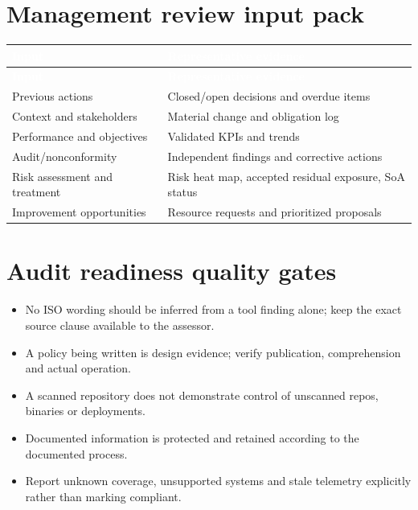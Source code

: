 \documentclass[11pt,letterpaper]{article}
\begin{document}
\section{Management review input pack}
\small{}\begin{longtable}{>{\raggedright\arraybackslash}p{}>{\raggedright\arraybackslash}p{}}
\rowcolor{navy} \textcolor{white}{\textbf{Input}} & \textcolor{white}{\textbf{Representative evidence}}\\
\endfirsthead
\rowcolor{navy} \textcolor{white}{\textbf{Input}} & \textcolor{white}{\textbf{Representative evidence}}\\
\endhead
Previous actions & Closed/open decisions and overdue items\\
Context and stakeholders & Material change and obligation log\\
Performance and objectives & Validated KPIs and trends\\
Audit/nonconformity & Independent findings and corrective actions\\
Risk assessment and treatment & Risk heat map, accepted residual exposure, SoA status\\
Improvement opportunities & Resource requests and prioritized proposals\\
\end{longtable}\normalsize

\section{Audit readiness quality gates}
\begin{itemize}
\item No ISO wording should be inferred from a tool finding alone; keep the exact source clause available to the assessor.
\item A policy being written is design evidence; verify publication, comprehension and actual operation.
\item A scanned repository does not demonstrate control of unscanned repos, binaries or deployments.
\item Documented information is protected and retained according to the documented process.
\item Report unknown coverage, unsupported systems and stale telemetry explicitly rather than marking compliant.
\end{itemize}
\end{document}
